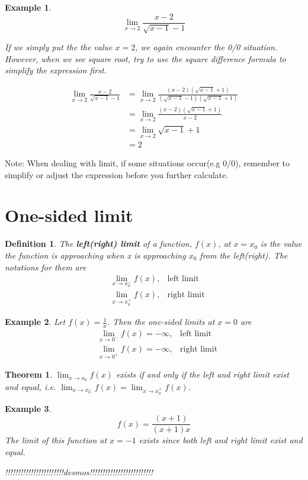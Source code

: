 \documentclass{article}
\newtheorem{definition}{Definition}
\newtheorem{ex}{Example}
\newtheorem{thm}{Theorem}
\begin{document}
\begin{ex}
	\[\lim_{x\to2}\frac{x-2}{\sqrt{x-1} -1}\]
	
	If we simply put the the value $x=2$, we again encounter the 0/0 situation.
	However, when we see square root, try to use the square difference formula to simplify the expression first.
	
	\begin{align*}
	\lim_{x\to2}\frac{x-2}{\sqrt{x-1} -1} 
	&= \lim_{x\to2}\frac{(x-2)(\sqrt{x-1}+1)}{(\sqrt{x-1} -1)(\sqrt{x-1}+1)}\\
	&= \lim_{x\to2} \frac{(x-2)(\sqrt{x-1}+1)}{x-2}\\
	&= \lim_{x\to2} \sqrt{x-1}+1\\
	&= 2 
	\end{align*} 
\end{ex}


Note: When dealing with limit, if some situations occur(e.g 0/0), remember to simplify or adjust the expression before you further calculate.

\section{One-sided limit}
\begin{definition}
	The \textbf{left(right) limit} of a function, $f(x)$, at $x=x_0$ is the value the function is approaching when x is approaching $x_0$ from the left(right).  The notations for them are
	\begin{align}
	&\lim_{x\to x_0^-}f(x), &\text{left limit}\\
	&\lim_{x\to x_0^+}f(x), &\text{right limit}
	\end{align}
\end{definition}

\begin{ex}
	Let $f(x)= \frac{1}{x}$. Then the one-sided limits at $x=0$ are
	\begin{align*}
	&\lim_{x\to 0^-}f(x) = -\infty, &\text{left limit}\\
	&\lim_{x\to 0^+}f(x)= -\infty, &\text{right limit}
	\end{align*}
\end{ex}


\begin{thm}
	$\lim_{x\to x_0} f(x)$ exists if and only if the left and right limit exist and equal, i.e. $\lim_{x\to x_0^-}f(x)=\lim_{x\to x_0^+}f(x)$.
\end{thm}

\begin{ex}
	\[f(x) = \frac{(x+1)}{(x+1)x}\]
	The limit of this function at $x=-1$ exists since both left and right limit exist and equal.
	
	\begin{center}
		!!!!!!!!!!!!!!!!!!!!!!!desmos!!!!!!!!!!!!!!!!!!!!!!!!!
	\end{center}
\end{ex}
\end{document}
